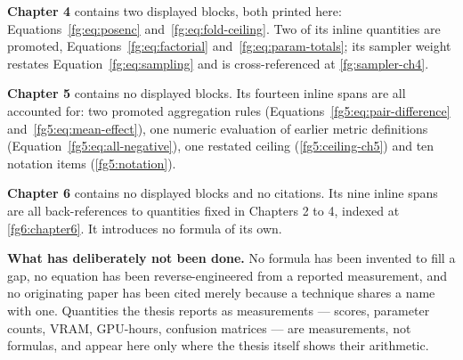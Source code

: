 \documentclass[11pt,a4paper]{article}
\numberwithin{equation}{section}
\begin{document}
\textbf{Chapter 4} contains two displayed blocks, both printed here:
Equations~\eqref{fg:eq:posenc} and~\eqref{fg:eq:fold-ceiling}. Two of its
inline quantities are promoted, Equations~\eqref{fg:eq:factorial}
and~\eqref{fg:eq:param-totals}; its sampler weight restates
Equation~\eqref{fg:eq:sampling} and is cross-referenced at
\autoref{fg:sampler-ch4}.

\textbf{Chapter 5} contains no displayed blocks. Its fourteen inline spans are
all accounted for: two promoted aggregation rules
(Equations~\eqref{fg5:eq:pair-difference} and~\eqref{fg5:eq:mean-effect}), one
numeric evaluation of earlier metric definitions
(Equation~\eqref{fg5:eq:all-negative}), one restated ceiling
(\autoref{fg5:ceiling-ch5}) and ten notation items
(\autoref{fg5:notation}).

\textbf{Chapter 6} contains no displayed blocks and no citations. Its nine
inline spans are all back-references to quantities fixed in Chapters 2 to 4,
indexed at \autoref{fg6:chapter6}. It introduces no formula of its own.

\textbf{What has deliberately not been done.} No formula has been invented to
fill a gap, no equation has been reverse-engineered from a reported
measurement, and no originating paper has been cited merely because a technique
shares a name with one. Quantities the thesis reports as measurements ---
scores, parameter counts, VRAM, GPU-hours, confusion matrices --- are
measurements, not formulas, and appear here only where the thesis itself shows
their arithmetic.
\end{document}
